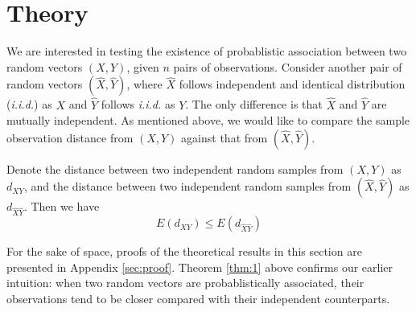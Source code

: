 \documentclass{sig-alternate}
\begin{document}
\section{Theory}
\label{sec:funcs}


We are interested in testing the existence of probablistic association
between two random vectors $(X,Y)$, given $n$ pairs of observations.
Consider another pair of random vectors $(\hat{X}, \hat{Y})$, where
$\hat{X}$ follows independent and identical distribution
(\emph{i.i.d.}) as $X$ and $\hat{Y}$ follows \emph{i.i.d.} as $Y$. The
only difference is that $\hat{X}$ and $\hat{Y}$ are mutually
independent. As mentioned above, we would like to compare the sample
observation distance from $(X,Y)$ against that from
$(\hat{X},\hat{Y})$.
\begin{thm}
  \label{thm:1}
  Denote the distance between two independent random samples from
  $(X,Y)$ as $d_{XY}$, and the distance between two independent random
  samples from $(\hat{X},\hat{Y})$ as $d_{\hat{X}\hat{Y}}$. Then we
  have
  \begin{displaymath}
    E(d_{XY}) \le E(d_{\hat{X}\hat{Y}})
  \end{displaymath}
\end{thm}
For the sake of space, proofs of the theoretical results in this
section are presented in Appendix \ref{sec:proof}. Theorem \ref{thm:1}
above confirms our earlier intuition: when two random vectors are
probablistically associated, their observations tend to be closer
compared with their independent counterparts. 
\end{document}

